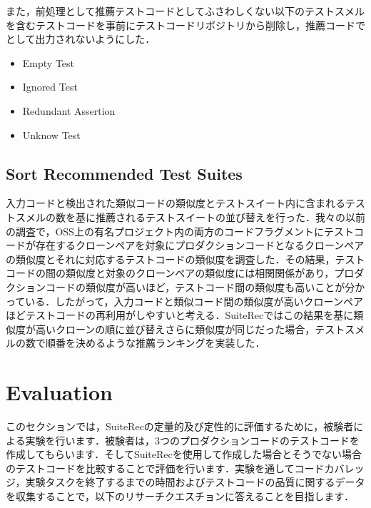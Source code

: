 \documentclass[conference]{IEEEtran}
\begin{document}
また，前処理として推薦テストコードとしてふさわしくない以下のテストスメルを含むテストコードを事前にテストコードリポジトリから削除し，推薦コードでとして出力されないようにした．　

\begin{itemize}
\item Empty Test
\item Ignored Test
\item Redundant Assertion
\item Unknow Test
\end{itemize}

\subsection{Sort Recommended Test Suites}
入力コードと検出された類似コードの類似度とテストスイート内に含まれるテストスメルの数を基に推薦されるテストスイートの並び替えを行った．我々の以前の調査で，OSS上の有名プロジェクト内の両方のコードフラグメントにテストコードが存在するクローンペアを対象にプロダクションコードとなるクローンペアの類似度とそれに対応するテストコードの類似度を調査した．その結果，テストコードの間の類似度と対象のクローンペアの類似度には相関関係があり，プロダクションコードの類似度が高いほど，テストコード間の類似度も高いことが分かっている．したがって，入力コードと類似コード間の類似度が高いクローンペアほどテストコードの再利用がしやすいと考える．SuiteRecではこの結果を基に類似度が高いクローンの順に並び替えさらに類似度が同じだった場合，テストスメルの数で順番を決めるような推薦ランキングを実装した．

\section{Evaluation}

このセクションでは，SuiteRecの定量的及び定性的に評価するために，被験者による実験を行います．被験者は，3つのプロダクションコードのテストコードを作成してもらいます．そしてSuiteRecを使用して作成した場合とそうでない場合のテストコードを比較することで評価を行います．実験を通してコードカバレッジ，実験タスクを終了するまでの時間およびテストコードの品質に関するデータを収集することで，以下のリサーチクエスチョンに答えることを目指します．
\end{document}
